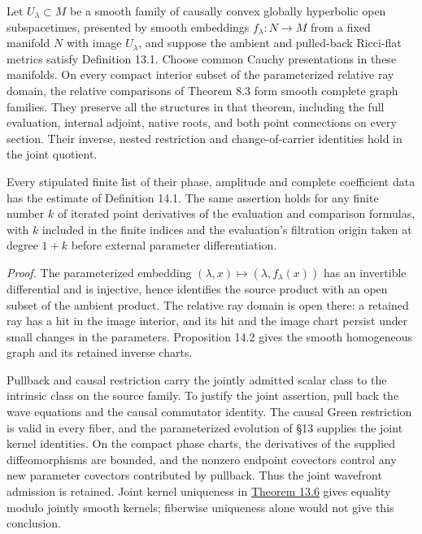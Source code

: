 \documentclass[
  english,
  11pt,
  reqno]{amsart}
\begin{document}
Let \(U_\lambda\subset M\) be a smooth family of causally convex
globally hyperbolic open subspacetimes, presented by smooth embeddings
\(f_\lambda:N\to M\) from a fixed manifold \(N\) with image
\(U_\lambda\), and suppose the ambient and pulled-back Ricci-flat
metrics satisfy Definition 13.1. Choose common Cauchy presentations in
these manifolds. On every compact interior subset of the parameterized
relative ray domain, the relative comparisons of Theorem 8.3 form smooth
complete graph families. They preserve all the structures in that
theorem, including the full evaluation, internal adjoint, native roots,
and both point connections on every section. Their inverse, nested
restriction and change-of-carrier identities hold in the joint quotient.

Every stipulated finite list of their phase, amplitude and complete
coefficient data has the estimate of Definition 14.1. The same assertion
holds for any finite number \(k\) of iterated point derivatives of the
evaluation and comparison formulas, with \(k\) included in the finite
indices and the evaluation's filtration origin taken at degree \(1+k\)
before external parameter differentiation.

\emph{Proof.} The parameterized embedding
\((\lambda,x)\mapsto(\lambda,f_\lambda(x))\) has an invertible
differential and is injective, hence identifies the source product with
an open subset of the ambient product. The relative ray domain is open
there: a retained ray has a hit in the image interior, and its hit and
the image chart persist under small changes in the parameters.
Proposition 14.2 gives the smooth homogeneous graph and its retained
inverse charts.

Pullback and causal restriction carry the jointly admitted scalar class
to the intrinsic class on the source family. To justify the joint
assertion, pull back the wave equations and the causal commutator
identity. The causal Green restriction is valid in every fiber, and the
parameterized evolution of §13 supplies the joint kernel identities. On
the compact phase charts, the derivatives of the supplied
diffeomorphisms are bounded, and the nonzero endpoint covectors control
any new parameter covectors contributed by pullback. Thus the joint
wavefront admission is retained. Joint kernel uniqueness in
\hyperref[thm:family-global-canonical-wave]{Theorem 13.6} gives equality
modulo jointly smooth kernels; fiberwise uniqueness alone would not give
this conclusion.
\end{document}
